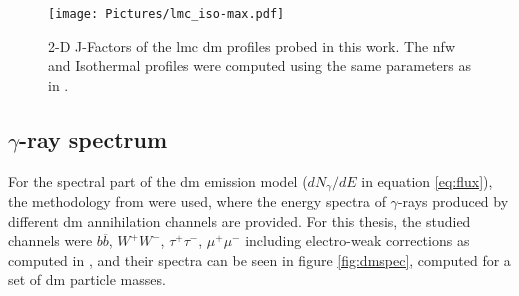 \documentclass[main.tex]{subfiles}
\begin{document}
\begin{figure}[h]
\endminipage
{}
\texttt{[image: Pictures/lmc\_iso-max.pdf]}
\endminipage
  \caption{2-D J-Factors of the \gls{lmc} \gls{dm} profiles probed in this work. The \gls{nfw} and Isothermal profiles were computed using the same parameters as in \cite{2015FermiLMCDM}.}
    \label{fig:jfactors}
\end{figure}

\subsection{$\gamma$-ray spectrum}

For the spectral part of the \gls{dm} emission model ($dN_{\gamma}/dE$ in equation \ref{eq:flux}), the methodology from \cite{2011cirelli} were used, where the energy spectra of $\gamma$-rays produced by different \gls{dm} annihilation channels are provided. For this thesis, the studied channels were $b \overline b$, $W^+ W^-$, $\tau^+\tau^-$, $\mu^+ \mu^-$ including electro-weak corrections as computed in \cite{2011EWcorrections}, and their spectra can be seen in figure \ref{fig:dmspec}, computed for a set of \gls{dm} particle masses.
\end{document}

